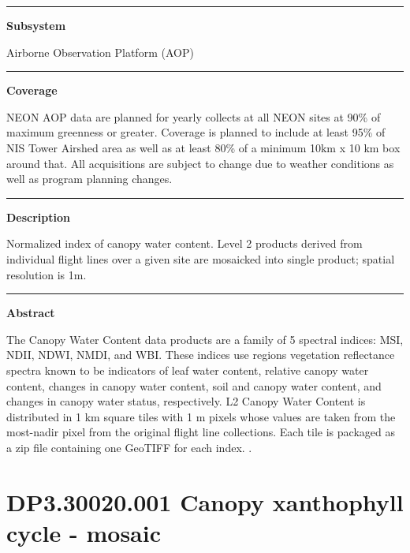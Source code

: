 \documentclass[]{article}
\begin{document}
\begin{center}\rule{0.5\linewidth}{\linethickness}\end{center}

\textbf{Subsystem}

Airborne Observation Platform (AOP)

\begin{center}\rule{0.5\linewidth}{\linethickness}\end{center}

\textbf{Coverage}

NEON AOP data are planned for yearly collects at all NEON sites at 90\%
of maximum greenness or greater. Coverage is planned to include at least
95\% of NIS Tower Airshed area as well as at least 80\% of a minimum
10km x 10 km box around that. All acquisitions are subject to change due
to weather conditions as well as program planning changes.

\begin{center}\rule{0.5\linewidth}{\linethickness}\end{center}

\textbf{Description}

Normalized index of canopy water content. Level 2 products derived from
individual flight lines over a given site are mosaicked into single
product; spatial resolution is 1m.

\begin{center}\rule{0.5\linewidth}{\linethickness}\end{center}

\textbf{Abstract}

The Canopy Water Content data products are a family of 5 spectral
indices: MSI, NDII, NDWI, NMDI, and WBI. These indices use regions
vegetation reflectance spectra known to be indicators of leaf water
content, relative canopy water content, changes in canopy water content,
soil and canopy water content, and changes in canopy water status,
respectively. L2 Canopy Water Content is distributed in 1 km square
tiles with 1 m pixels whose values are taken from the most-nadir pixel
from the original flight line collections. Each tile is packaged as a
zip file containing one GeoTIFF for each index. \newpage
.

\section{DP3.30020.001 Canopy xanthophyll cycle -
mosaic}\label{dp3.30020.001-canopy-xanthophyll-cycle---mosaic}
\end{document}
